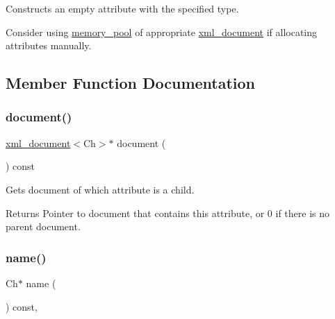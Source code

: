 Constructs an empty attribute with the specified type. 

Consider using \mbox{\hyperlink{classrapidxml_1_1memory__pool}{memory\+\_\+pool}} of appropriate \mbox{\hyperlink{classrapidxml_1_1xml__document}{xml\+\_\+document}} if allocating attributes manually. 

\subsection{Member Function Documentation}
\mbox{\label{classrapidxml_1_1xml__attribute_ae5396d92d09394b37838f2518f430da4}} 
\subsubsection{\texorpdfstring{document()}{document()}}
{\footnotesize\ttfamily \mbox{\hyperlink{classrapidxml_1_1xml__document}{xml\+\_\+document}}$<$Ch$>$$\ast$ document (\begin{DoxyParamCaption}{ }\end{DoxyParamCaption}) const\hspace{0.3cm}{\ttfamily [inline]}}



Gets document of which attribute is a child. 

\begin{DoxyReturn}{Returns}
Pointer to document that contains this attribute, or 0 if there is no parent document. 
\end{DoxyReturn}
\mbox{\label{classrapidxml_1_1xml__base_af8436e9ee14c127220113eaa956eafee}} 
\subsubsection{\texorpdfstring{name()}{name()}\hspace{0.1cm}{\footnotesize\ttfamily [1/3]}}
{\footnotesize\ttfamily Ch$\ast$ name (\begin{DoxyParamCaption}{ }\end{DoxyParamCaption}) const\hspace{0.3cm}{\ttfamily [inline]}, {\ttfamily [inherited]}}




